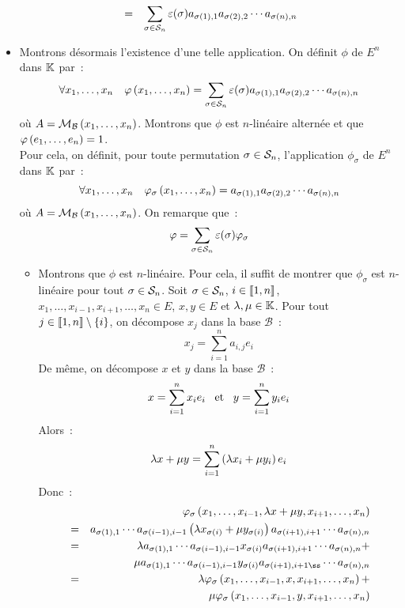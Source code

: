 \documentclass{magnolia}
\begin{document}
\begin{preuve}
\begin{itemize}
\begin{eqnarray*}
  &=& \sum_{\sigma\in\gsym{n}}
      \signat{\sigma} a_{\sigma\p{1},1} a_{\sigma\p{2},2} \cdots a_{\sigma(n),n}
  \end{eqnarray*}
\item Montrons désormais l'existence d'une telle application. On définit $\phi$ de
  $E^n$ dans $\mathbb{K}$ par~:
  \[\forall x_1,\ldots,x_n \quad
    \phi\p{x_1,\ldots,x_n}=\sum_{\sigma\in\gsym{n}} \signat{\sigma}
    a_{\sigma\p{1},1}a_{\sigma\p{2},2}\cdots a_{\sigma(n),n}\]
  où $A=\mathcal{M}_{\mathcal{B}}\left(x_1,\ldots,x_n\right)$. Montrons que $\phi$ est $n$-linéaire
  alternée et que $\varphi\left(e_1,\ldots,e_n\right)=1$.\\
  Pour cela, on définit, pour toute permutation $\sigma\in\mathcal{S}_{n}$, l'application
  $\phi_\sigma$ de $E^n$ dans $\mathbb{K}$ par~:
  \[\forall x_1,\ldots,x_n \quad \varphi_\sigma \left(x_1,\ldots,x_n\right)=
    a_{\sigma\left(1\right),1}a_{\sigma\left(2\right),2}\cdots a_{\sigma(n),n}\]
  où $A=\mathcal{M}_{\mathcal{B}}\left(x_1,\ldots,x_n\right)$. On remarque que~:
  \[\phi=\sum_{\sigma\in\gsym{n}} \signat{\sigma} \phi_{\sigma}\]
  \begin{itemize}
  \item Montrons que $\phi$ est $n$-linéaire. Pour cela, il suffit de montrer que
    $\phi_\sigma$ est $n$-linéaire pour tout $\sigma\in\mathcal{S}_{n}$. Soit
    $\sigma\in\mathcal{S}_{n}$, $i\in\left\llbracket 1,n\right\rrbracket$,
    $x_1,\ldots,x_{i-1},x_{i+1},\ldots,x_n\in E$, $x,y\in E$ et $\lambda,\mu\in\mathbb{K}$.
    Pour tout $j\in\left\llbracket 1,n\right\rrbracket\setminus\left\{i\right\}$, on décompose $x_j$ dans la
    base $\mathcal{B}$~:
    \[x_j=\sum_{i=1}^n a_{i,j} e_i\]
    De même, on décompose $x$ et $y$ dans la base $\mathcal{B}$~:
    \[x=\sum_{i=1}^n x_i e_i \quad\!\text{et}\quad\! y=\sum_{i=1}^n y_i e_i\]
    Alors~:
    \[\lambda x+\mu y=\sum_{i=1}^n \left(\lambda x_i+\mu y_i\right) e_i\]
    Donc~:
    \begin{eqnarray*}
    & & \phi_\sigma \p{x_1,\ldots,x_{i-1},\lambda x+\mu y,x_{i+1},\ldots,x_n}\\
    &=& a_{\sigma\p{1},1}\cdots a_{\sigma\p{i-1},i-1} \p{\lambda x_{\sigma(i)}
           +\mu y_{\sigma(i)}} a_{\sigma\p{i+1},i+1} \cdots a_{\sigma(n),n}\\
    &=& \lambda a_{\sigma\p{1},1}\cdots a_{\sigma\p{i-1},i-1} x_{\sigma(i)}
        a_{\sigma\p{i+1},i+1} \cdots a_{\sigma(n),n} +\\
    & & \mu a_{\sigma\p{1},1}\cdots a_{\sigma\p{i-1},i-1} y_{\sigma(i)}
        a_{\sigma\p{i+1},i+1ß} \cdots a_{\sigma(n),n}\\
    &=& \lambda \phi_\sigma \p{x_1,\ldots,x_{i-1},x,x_{i+1},\ldots,x_n}+\\
    & & \mu     \phi_\sigma \p{x_1,\ldots,x_{i-1},y,x_{i+1},\ldots,x_n}

\end{eqnarray*}
\end{itemize}
\end{itemize}
\end{preuve}
\end{document}
